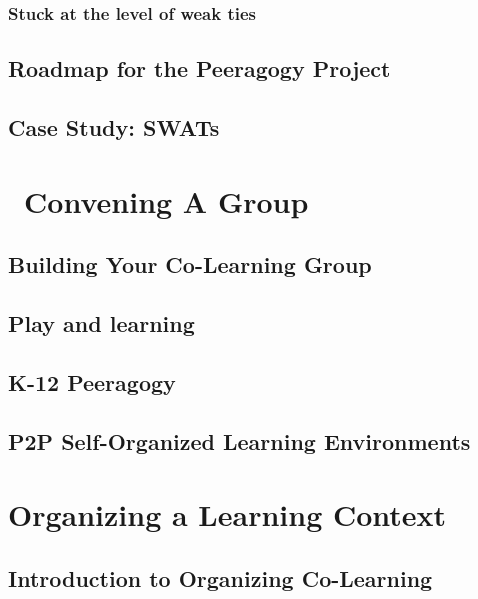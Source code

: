 \documentclass[ebook, 12pt, twoside]{memoir}
\begin{document}
\section*{Stuck at the level of weak ties}


\chapter{Roadmap for the Peeragogy Project} \label{distributed-roadmap}



\chapter{Case Study: SWATs}


\part{~Convening A Group} \label{convening-part} %
%
\chapter[\textbf{Convening}]{Building Your Co-Learning Group}

%
\chapter[\textbf{Play and learning}]{Play and learning}
%

%
\chapter[\textbf{K-12 Peeragogy}]{K-12 Peeragogy}
%

%
\chapter[\textbf{P2P SOLE}]{P2P Self-Organized Learning Environments}
%

%

\part{Organizing a Learning Context} \label{organizing-part} %
%
\chapter[\textbf{Organizing Co-Learning}]{Introduction to Organizing Co-Learning}

%
\end{document}
